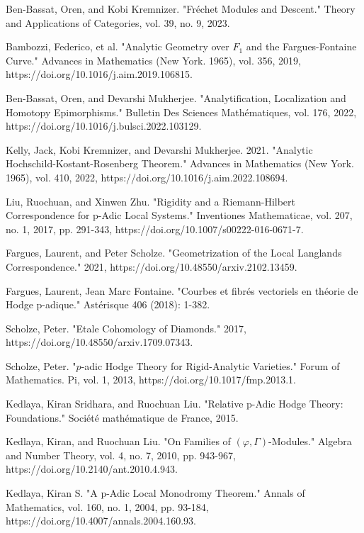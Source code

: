 \documentclass[12pt]{book}
\theoremstyle{definition}
\begin{document}
\begin{thebibliography}{10}
 Ben-Bassat, Oren, and Kobi Kremnizer. "Fr\'echet Modules and Descent." Theory and Applications of Categories, vol. 39, no. 9, 2023.

 Bambozzi, Federico, et al. "Analytic Geometry over $F_1$ and the Fargues-Fontaine Curve." Advances in Mathematics (New York. 1965), vol. 356, 2019, https://doi.org/10.1016/j.aim.2019.106815.

 Ben-Bassat, Oren, and Devarshi Mukherjee. "Analytification, Localization and Homotopy Epimorphisms." Bulletin Des Sciences Math\'ematiques, vol. 176, 2022, https://doi.org/10.1016/j.bulsci.2022.103129.

 Kelly, Jack, Kobi Kremnizer, and Devarshi Mukherjee. 2021. "Analytic Hochschild-Kostant-Rosenberg Theorem." Advances in Mathematics (New York. 1965), vol. 410, 2022, https://doi.org/10.1016/j.aim.2022.108694.

 Liu, Ruochuan, and Xinwen Zhu. "Rigidity and a Riemann-Hilbert Correspondence for p-Adic Local Systems." Inventiones Mathematicae, vol. 207, no. 1, 2017, pp. 291-343, https://doi.org/10.1007/s00222-016-0671-7.

 Fargues, Laurent, and Peter Scholze. "Geometrization of the Local Langlands Correspondence." 2021, https://doi.org/10.48550/arxiv.2102.13459.
 
 Fargues, Laurent, Jean Marc Fontaine. "Courbes et fibr\'es vectoriels en th\'eorie de Hodge p-adique." Ast\'erisque 406 (2018): 1-382.

 Scholze, Peter. "Etale Cohomology of Diamonds." 2017, https://doi.org/10.48550/arxiv.1709.07343.

 Scholze, Peter. "$p$-adic Hodge Theory for Rigid-Analytic Varieties." Forum of Mathematics. Pi, vol. 1, 2013, https://doi.org/10.1017/fmp.2013.1.

 Kedlaya, Kiran Sridhara, and Ruochuan Liu. "Relative p-Adic Hodge Theory: Foundations." Soci\'et\'e math\'ematique de France, 2015.

 Kedlaya, Kiran, and Ruochuan Liu. "On Families of $(\varphi, \Gamma)$-Modules." Algebra and Number Theory, vol. 4, no. 7, 2010, pp. 943-967, https://doi.org/10.2140/ant.2010.4.943.

 Kedlaya, Kiran S. "A p-Adic Local Monodromy Theorem." Annals of Mathematics, vol. 160, no. 1, 2004, pp. 93-184, https://doi.org/10.4007/annals.2004.160.93.


\end{thebibliography}
\end{document}
